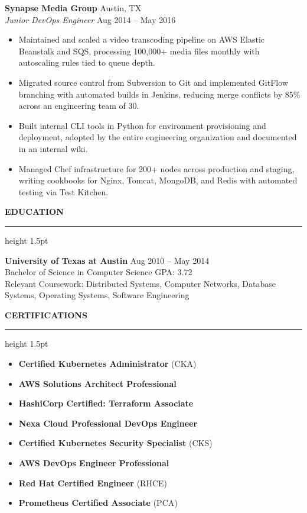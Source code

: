 \documentclass[11pt,a4paper]{article}
\newcommand{\sectionrule}{%
  \vspace{2pt}
  {\color{accent}\hrule height 1.5pt}
  \vspace{6pt}
}
\newcommand{\sectiontitle}[1]{%
  \vspace{10pt}
  {\normalsize\bfseries\color{primary}\MakeUppercase{#1}}
  \sectionrule
}
\newcommand{\roleheader}[4]{%
  {\bfseries\normalsize\color{primary}#1} \hfill {\normalsize\color{mediumgray}#2}\\[2pt]
  {\itshape\color{accent}#3} \hfill {\footnotesize\color{mediumgray}#4}\\[4pt]
}
\begin{document}
\roleheader{Synapse Media Group}{Austin, TX}{Junior DevOps Engineer}{Aug 2014 -- May 2016}
\begin{itemize}
  \item Maintained and scaled a video transcoding pipeline on AWS Elastic Beanstalk and SQS, processing 100,000+ media files monthly with autoscaling rules tied to queue depth.
  \item Migrated source control from Subversion to Git and implemented GitFlow branching with automated builds in Jenkins, reducing merge conflicts by 85\% across an engineering team of 30.
  \item Built internal CLI tools in Python for environment provisioning and deployment, adopted by the entire engineering organization and documented in an internal wiki.
  \item Managed Chef infrastructure for 200+ nodes across production and staging, writing cookbooks for Nginx, Tomcat, MongoDB, and Redis with automated testing via Test Kitchen.
\end{itemize}

\sectiontitle{Education}

{\bfseries\color{primary}University of Texas at Austin} \hfill {\color{mediumgray}Aug 2010 -- May 2014}\\[2pt]
{\color{mediumgray}Bachelor of Science in Computer Science \textbullet{} GPA: 3.72}\\[2pt]
{\footnotesize\color{mediumgray}Relevant Coursework: Distributed Systems, Computer Networks, Database Systems, Operating Systems, Software Engineering}

\sectiontitle{Certifications}

\begin{minipage}[t]{0.48\textwidth}
  \begin{itemize}
    \item \textbf{Certified Kubernetes Administrator} (CKA)
    \item \textbf{AWS Solutions Architect Professional}
    \item \textbf{HashiCorp Certified: Terraform Associate}
    \item \textbf{Nexa Cloud Professional DevOps Engineer}
  \end{itemize}
\end{minipage}
\hfill
\begin{minipage}[t]{0.48\textwidth}
  \begin{itemize}
    \item \textbf{Certified Kubernetes Security Specialist} (CKS)
    \item \textbf{AWS DevOps Engineer Professional}
    \item \textbf{Red Hat Certified Engineer} (RHCE)
    \item \textbf{Prometheus Certified Associate} (PCA)
  \end{itemize}
\end{minipage}
\end{document}
